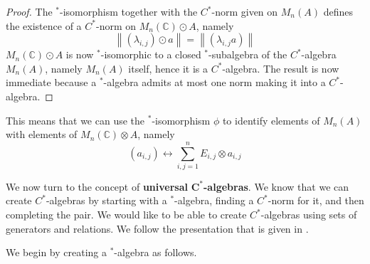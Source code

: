 \documentclass{article}
\theoremstyle{plain}
\theoremstyle{definition}
\theoremstyle{remark}
\newcommand{\norm}[1]{\left\lVert#1\right\rVert}
\begin{document}
\begin{proof}
	The $^*$-isomorphism together with the $C^*$-norm given on $M_n(A)$
	defines the existence of a $C^*$-norm on $M_n(\mathbb{C}) \odot A$,
	namely
	\begin{equation}
		\norm{(\lambda_{i,j}) \odot a}
		=
		\norm{(\lambda_{i,j}a)}
	\end{equation}
	$M_n(\mathbb{C}) \odot A$
	is now $^*$-isomorphic to a closed $^*$-subalgebra
	of the $C^*$-algebra $M_n(A)$, namely $M_n(A)$ itself,
	hence 
	it is a $C^*$-algebra.
	The result is now immediate 
	because a $^*$-algebra admits at most one norm making it into a $C^*$-algebra.
\end{proof}

This means that we can use the $^*$-isomorphism $\phi$
to identify elements of $M_n(A)$
with elements of $M_n(\mathbb{C}) \otimes A$, namely
\begin{equation}
	(a_{i,j}) \leftrightarrow \sum_{i,j = 1}^n E_{i,j} \otimes a_{i,j}
\end{equation}



We now turn to the concept of \textbf{universal} $\bm{C^*}$\textbf{-algebras}.
We know that we can create $C^*$-algebras by starting with
a $^*$-algebra, finding a $C^*$-norm for it, and then completing the pair.
We would like to be able to create $C^*$-algebras 
using sets of generators and relations.
We follow the presentation that is given in \citet[Chapter 6]{speich}.

We begin by creating a $^*$-algebra as follows.
\end{document}
